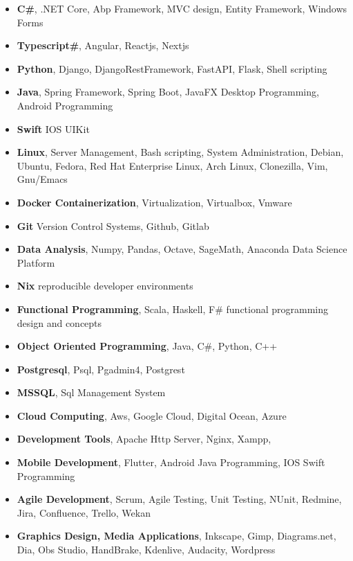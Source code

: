 \documentclass[line,margin]{res}
\begin{document}
\begin{resume}
                 \begin{itemize}  \itemsep -2pt %
                   \item \textbf{C\#}, .NET Core, Abp Framework, MVC design, Entity Framework, Windows Forms
                   \item \textbf{Typescript\#}, Angular, Reactjs, Nextjs
                   \item \textbf{Python}, Django, DjangoRestFramework, FastAPI, Flask, Shell scripting
                   \item \textbf{Java}, Spring Framework, Spring Boot, JavaFX Desktop Programming, Android Programming
                   \item \textbf{Swift} IOS UIKit
                   \item \textbf{Linux}, Server Management, Bash scripting, System Administration, Debian, Ubuntu, Fedora, Red Hat Enterprise Linux, Arch Linux, Clonezilla, Vim, Gnu/Emacs
                   \item \textbf{Docker Containerization}, Virtualization, Virtualbox, Vmware
                   \item \textbf{Git} Version Control Systems, Github, Gitlab
                   \item \textbf{Data Analysis}, Numpy, Pandas, Octave, SageMath, Anaconda Data Science Platform 
                   \item \textbf{Nix} reproducible developer environments
                   \item \textbf{Functional Programming}, Scala, Haskell, F\# functional programming design and concepts 
                   \item \textbf{Object Oriented Programming}, Java, C\#, Python, C++ 
                   \item \textbf{Postgresql}, Psql, Pgadmin4, Postgrest 
                   \item \textbf{MSSQL}, Sql Management System 
                   \item \textbf{Cloud Computing}, Aws, Google Cloud, Digital Ocean, Azure
                   \item \textbf{Development Tools}, Apache Http Server, Nginx, Xampp, 
                   \item \textbf{Mobile Development}, Flutter, Android Java Programming, IOS Swift Programming
                   \item \textbf{Agile Development},  Scrum, Agile Testing, Unit Testing, NUnit, Redmine, Jira, Confluence, Trello, Wekan
                   \item \textbf{Graphics Design, Media Applications}, Inkscape, Gimp, Diagrams.net, Dia, Obs Studio, HandBrake, Kdenlive, Audacity, Wordpress
 

\end{itemize}
\end{resume}
\end{document}

